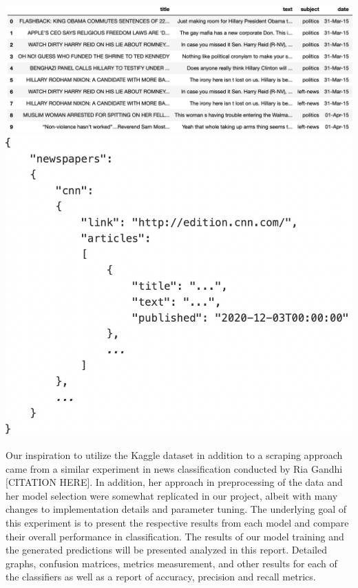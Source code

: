\documentclass[10pt,twocolumn,letterpaper]{article}
\begin{document}
\begin{center}
\includegraphics[width=\linewidth]{dt_example.png}
\includegraphics[width=\linewidth]{scraped_example.png}
\end{center}
Our inspiration to utilize the Kaggle dataset in addition to a scraping approach came from a similar experiment in news classification conducted by Ria Gandhi [CITATION HERE]. In addition, her approach in preprocessing of the data and her model selection were somewhat replicated in our project, albeit with many changes to implementation details and parameter tuning. The underlying goal of this experiment is to present the respective results from each model and compare their overall performance in classification. The results of our model training and the generated predictions will be presented analyzed in this report. Detailed graphs, confusion matrices, metrics measurement, and other results  for each of the classifiers as well as a report of accuracy, precision and recall metrics. 
\end{document}
